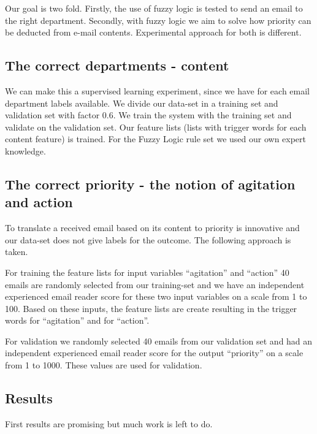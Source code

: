 \documentclass[journal]{IEEEtran}
\begin{document}
Our goal is two fold. Firstly, the use of fuzzy logic is tested to send an email to the right department. Secondly, with fuzzy logic we aim to solve how priority can be deducted from e-mail contents. Experimental approach for both is different. 

\subsection{The correct departments - content}

We can make this a supervised learning experiment, since we have for each email department labels available. We divide our data-set in a training set and validation set with factor 0.6. We train the system with the training set and validate on the validation set. Our feature lists (lists with trigger words for each content feature) is trained. For the Fuzzy Logic rule set we used our own expert knowledge.

\subsection{The correct priority - the notion of agitation and action}

To translate a received email based on its content to priority is innovative and our data-set does not give labels for the outcome. The following approach is taken. 

For training the feature lists for input variables ``agitation'' and ``action'' 40 emails are randomly selected from our training-set and we have an independent experienced email reader score for these two input variables on a scale from 1 to 100. Based on these inputs, the feature lists are create resulting in the trigger words for ``agitation'' and for ``action''. 

For validation we randomly selected 40 emails from our validation set and had an independent experienced email reader score for the output ``priority'' on a scale from 1 to 1000. These values are used for validation. 

\subsection{Results}

First results are promising but much work is left to do. 
\end{document}
